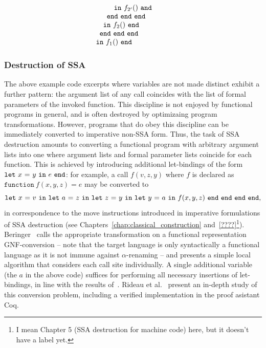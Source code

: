 \begin{equation}
\begin{array}{l}
\begin{array}{l}
\begin{array}[t]{l}
\begin{array}{l}
\begin{array}[t]{l}
\begin{array}[t]{l}
\begin{array}{l}
                 \end{array}\\
                 \mathtt{in}\ f_{2'}()\ \mathtt{and}
               \end{array}
           \end{array}\\
           \mathtt{end\ end\ end}
         \end{array}\\
     \mathtt{in}\ f_2()\ \mathtt{end}
     \end{array}\\
     \mathtt{end\ end\ end}\\
   \end{array}\\
\mathtt{in}\ f_1()\  \mathtt{end}
\end{array}
\end{equation}

\subsubsection{Destruction of SSA}

The above example code excerpts where variables are not made distinct
exhibit a further pattern: the argument list of any call coincides
with the list of formal parameters of the invoked function. This
discipline is not enjoyed by functional programs in general, and is
often destroyed by optimizaing program transformations. However,
programs that do obey this discipline can be immediately converted to
imperative non-SSA form. Thus, the task of SSA destruction amounts to
converting a functional program with arbitrary argument lists into one
where argument lists and formal parameter lists coincide for each
function. This is achieved by introducing additional let-bindings of
the form $\mathtt{let}\ {x}\ \mathtt{=}\ {y}\ \mathtt{in}\ {e}\ \mathtt{end}$: for example, a call $f(v,z,y)$ where $f$ is
declared as $\mathtt{function}\ f(x,y,z) = e$ may be converted to
$$\mathtt{let}\ {x}\ \mathtt{=}\ {v}\ \mathtt{in}\ {\mathtt{let}\ {a}\ \mathtt{=}\ {z}\ \mathtt{in}\ {\mathtt{let}\ {z}\ \mathtt{=}\ {y}\ \mathtt{in}\ {\mathtt{let}\ {y}\ \mathtt{=}\ {a}\ \mathtt{in}\ {f(x,y,z)}\ \mathtt{end}}\ \mathtt{end}}\ \mathtt{end}}\ \mathtt{end},$$ in
correspondence to the move instructions introduced in imperative
formulations of SSA destruction (see
Chapters~\ref{chap:classical_construction} and~\ref{????}\footnote{I
mean Chapter 5 (SSA destruction for machine code) here, but it doesn't
have a label yet.}).  Beringer~\cite{DBLP:journals/entcs/Beringer07}
calls the appropriate transformation on a functional representation
GNF-conversion -- note that the target language is only syntactically
a functional language as it is not immune against $\alpha$-renaming --
and presents a simple local algorithm that considers each call site
individually. A single additional variable (the $a$ in the above code)
suffices for performing all necessary insertions of let-bindings, in
line with the results of~\cite{May}. Rideau et
al.~\cite{DBLP:journals/jar/RideauSL08} present an in-depth study of
this conversion problem, including a verified implementation in the
proof asistant Coq.

